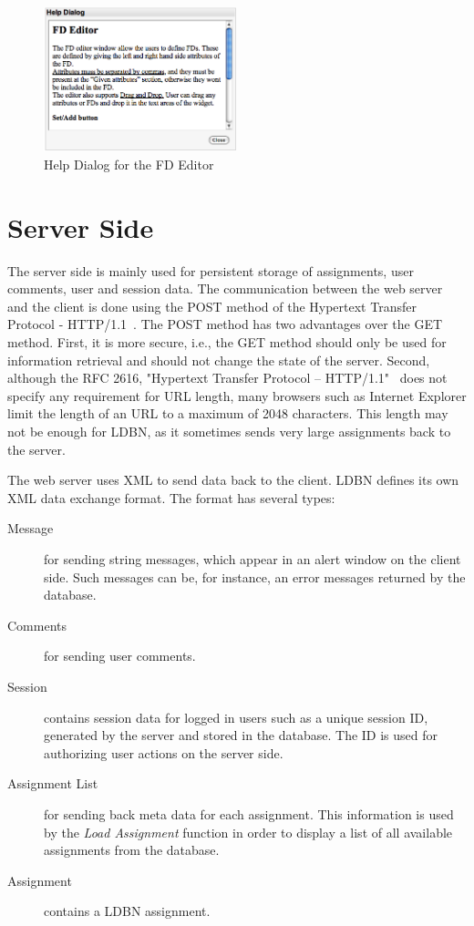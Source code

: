 \begin{figure}[h]
	\begin{center}
		\includegraphics[width=0.5\textwidth]{./img/screen-help.png}
		\caption{Help Dialog for the FD Editor}
		\label{fig:screen-help}
	\end{center}
\end{figure}


\section{Server Side}
The server side is mainly used for persistent storage of assignments, user comments,
user and session data. The communication between the web server and the client
is done using the POST method of the Hypertext Transfer Protocol - HTTP/1.1~\cite{w6}.
The POST method has two advantages over the GET method. First, it is more secure, i.e., 
the GET method should only be used for information retrieval and should not change 
the state of the server. Second, although the
RFC 2616, "Hypertext Transfer Protocol -- HTTP/1.1"~\cite{w6} does not specify
any requirement for URL length, many browsers such as Internet Explorer limit
the length of an URL to a maximum of 2048 characters. This length may not be 
enough for LDBN, as it sometimes sends very large assignments back to the server.  

The web server uses XML to send data back to the client. LDBN defines its own XML data
exchange format. The format has several types:

\begin{description}
	\item[Message] for sending string messages, which appear in an alert window on 
	the client side. Such messages can be, for instance, an error messages returned
	by the database. 
	\item[Comments] for sending user comments. 
	\item[Session] contains session data for logged in users such as a unique session 
	ID, generated by the server and stored in the database. The ID is used for
	authorizing user actions on the server side.
	\item[Assignment List] for sending back meta data for each assignment. This
	information is used by the \textit{Load Assignment} function in order 
	to display a list of all available assignments from the database.
	\item[Assignment] contains a LDBN assignment. 
\end{description}  

